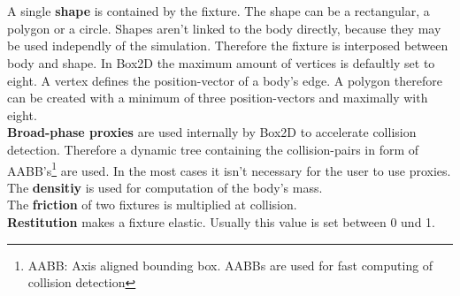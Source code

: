 \documentclass[10pt,a4paper,DIV=11]{scrreprt}
\begin{document}
   \\
\\

A single \textbf{shape} is contained by the fixture. The shape can be a rectangular, a polygon or a circle. Shapes aren't linked to the body directly, because they may be used independly of the simulation. Therefore the fixture is interposed between body and shape. In Box2D the maximum amount of vertices is defaultly set to eight. A vertex defines the position-vector of a body's edge. A polygon therefore can be created with a minimum of three position-vectors and maximally with eight.
\\

\textbf{Broad-phase proxies} are used internally by Box2D to accelerate collision detection. Therefore a dynamic tree containing the collision-pairs in form of AABB's\footnote{AABB: Axis aligned bounding box. AABBs are used for fast computing of collision detection} are used. In the most cases it isn't necessary for the user to use proxies. \\

The \textbf{densitiy} is used for computation of the body's mass.\\

The \textbf{friction} of two fixtures is multiplied at collision. \\

\textbf{Restitution} makes a fixture elastic. Usually this value is set between 0 und 1. \\
\end{document}
